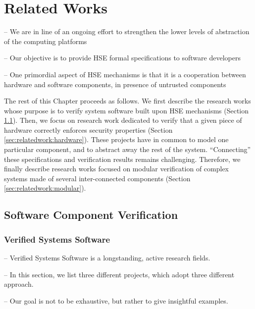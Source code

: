 \chapter{Related Works}
\label{chapter:relatedwork}

\begin{compactitem}
\item[--] We are in line of an ongoing effort to strengthen the lower levels of
  abstraction of the computing
  platforms\,\cite{potlapally2011hardwaresecurity,chong2016report}
\item[--] Our objective is to provide HSE formal specifications to software
  developers
\item[--] One primordial aspect of HSE mechanisms is that it is a cooperation
  between hardware and software components, in presence of untrusted components
\end{compactitem}

The rest of this Chapter proceeds as follows.
%
We first describe the research works whose purpose is to verify system software
built upon HSE mechanisms (Section\,\ref{sec:relatedwork:software}).
%
Then, we focus on research work dedicated to verify that a given piece of
hardware correctly enforces security properties
(Section\,\ref{sec:relatedwork:hardware}).
%
These projects have in common to model one particular component, and to abstract
away the rest of the system.
%
``Connecting'' these specifications and verification results remains
challenging.
%
Therefore, we finally describe research works focused on modular verification of
complex systems made of several inter-connected components
(Section\,\ref{sec:relatedwork:modular}).

\section{Software Component Verification} %
\label{sec:relatedwork:software}

\subsection{Verified Systems Software} %

\begin{compactitem}
\item[--] Verified Systems Software is a longstanding, active research fields.
\item[--] In this section, we list three different projects, which adopt three
  different approach.
\item[--] Our goal is not to be exhaustive, but rather to give insightful
  examples.
\end{compactitem}

